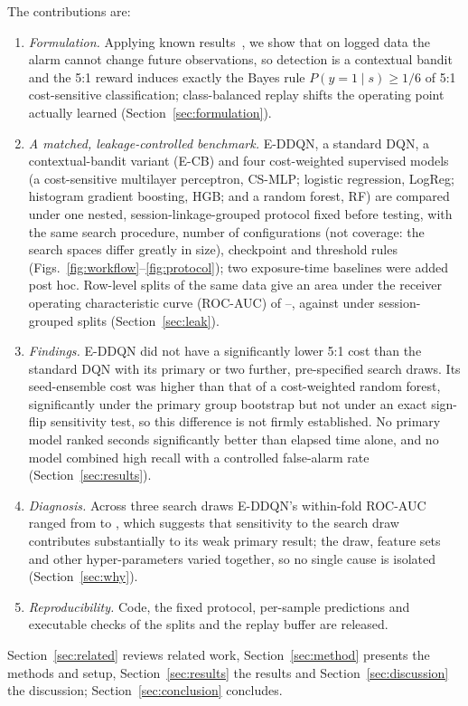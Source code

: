 The contributions are:
\begin{enumerate}
\item \emph{Formulation.} Applying known results~\cite{elkan2001cost,dudik2011efficient}, we show that on logged data the alarm cannot change future observations, so detection is a contextual bandit and the 5:1 reward induces exactly the Bayes rule $P(y=1\mid s)\ge1/6$ of 5:1 cost-sensitive classification; class-balanced replay shifts the operating point actually learned (Section~\ref{sec:formulation}).
\item \emph{A matched, leakage-controlled benchmark.} E-DDQN, a standard DQN, a contextual-bandit variant (E-CB) and four cost-weighted supervised models (a cost-sensitive multilayer perceptron, CS-MLP; logistic regression, LogReg; histogram gradient boosting, HGB; and a random forest, RF) are compared under one nested, session-linkage-grouped protocol fixed before testing, with the same search procedure, number of configurations (not coverage: the search spaces differ greatly in size), checkpoint and threshold rules (Figs.~\ref{fig:workflow}--\ref{fig:protocol}); two exposure-time baselines were added post hoc. Row-level splits of the same data give an area under the receiver operating characteristic curve (ROC-AUC) of \LeakRowRocAuc--\LeakOldRocAuc, against \LeakGrpRocAuc{} under session-grouped splits (Section~\ref{sec:leak}).
\item \emph{Findings.} E-DDQN did not have a significantly lower 5:1 cost than the standard DQN with its primary or two further, pre-specified search draws. Its seed-ensemble cost was higher than that of a cost-weighted random forest, significantly under the primary group bootstrap but not under an exact sign-flip sensitivity test, so this difference is not firmly established. No primary model ranked seconds significantly better than elapsed time alone, and no model combined high recall with a controlled false-alarm rate (Section~\ref{sec:results}).
\item \emph{Diagnosis.} Across three search draws E-DDQN's within-fold ROC-AUC ranged from \SDEDDQNWfMin{} to \SDEDDQNWfMax, which suggests that sensitivity to the search draw contributes substantially to its weak primary result; the draw, feature sets and other hyper-parameters varied together, so no single cause is isolated (Section~\ref{sec:why}).
\item \emph{Reproducibility.} Code, the fixed protocol, per-sample predictions and executable checks of the splits and the replay buffer are released.
\end{enumerate}
Section~\ref{sec:related} reviews related work, Section~\ref{sec:method} presents the methods and setup, Section~\ref{sec:results} the results and Section~\ref{sec:discussion} the discussion; Section~\ref{sec:conclusion} concludes.
